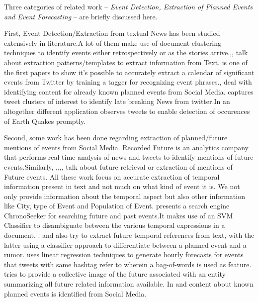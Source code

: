 Three categories of related work -- \emph{Event Detection, Extraction of Planned Events and  Event Forecasting} -- are briefly discussed here.

First, Event Detection/Extraction from textual News has been studied extensively in literature.A lot of them make use of document clustering techniques \cite{Allan:2002:TDT} \cite{Yang:1998:SRO}\cite{Gabrilovich:2004:NPP}to identify events either retrospectively or as the stories arrive.\cite{Chambers:2011:TIE},\cite{Banko07openinformation}, \cite{Riloff:2003:LEP} talk about extraction patterns/templates to extract information from Text. \cite{Ritter:2012} is one of the first papers to show it's possible to accurately extract a calendar of significant events from Twitter by training a tagger for recognizing event phrases.\cite{Becker:2012:ICP}, \cite{Becker_automaticidentification} deal with identifying content for already known planned events from Social Media.\cite{Sankaranarayanan:2009:TNT} captures tweet clusters of interest to identify late breaking News from twitter.In an altogether different application \cite{Sakaki:2010:EST} observes tweets to enable detection of occurences of Earth Quakes promptly.

Second, some work has been done regarding extraction of planned/future mentions of events from Social Media. Recorded Future\cite{recordedFuture} is an analytics company that performs real-time analysis of news and tweets to identify mentions of future events.Similarly, \cite{baeza2005searching},\cite{dias2011future},\cite{bosch2013estm},\cite{Jatowt:2011:ECE},\cite{Kawai:2010:CSE} talk about future retrieval or extraction of mentions of Future events. All these work focus on accurate extraction of temporal information present in text and not much on what kind of event it is. We not only provide information about the temporal aspect but also other information like City, type of Event and Population of Event. \cite{Kawai:2010:CSE} presents a search engine ChronoSeeker for searching future and past events.It makes use of an SVM Classifier to disambiguate between the various temporal expressions in a document. .\cite{baeza2005searching} and \cite{dias2011future} also try to extract future temporal references from text, with the latter using a classifier approach to differentiate between a planned event and a rumor.\cite{bosch2013estm} uses linear regression techniques to generate hourly forecasts for events that tweets with same hashtag refer to wherein a bag-of-words is used as feature.\cite{Jatowt:2011:ECE} tries to provide a collective image of the future associated with an entity summarizing all future related information available.
In \cite{Becker:2012:ICP} and \cite{Becker_automaticidentification} content about known planned events is identified from Social Media.

